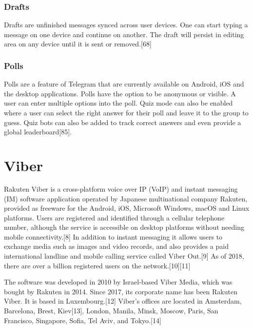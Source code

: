 \documentclass[12pt]{article}
\begin{document}
\subsubsection{Drafts}


Drafts are unfinished messages synced across user devices. One can start typing a message on one device and continue on another. The draft will persist in editing area on any device until it is sent or removed.[68]





\subsubsection{Polls}


Polls are a feature of Telegram that are currently available on Android, iOS and the desktop applications. Polls have the option to be anonymous or visible. A user can enter multiple options into the poll. Quiz mode can also be enabled where a user can select the right answer for their poll and leave it to the group to guess. Quiz bots can also be added to track correct answers and even provide a global leaderboard[85]. 







\section{Viber}



Rakuten Viber is a cross-platform voice over IP (VoIP) and instant messaging (IM) software application operated by Japanese multinational company Rakuten, provided as freeware for the Android, iOS, Microsoft Windows, macOS and Linux platforms. Users are registered and identified through a cellular telephone number, although the service is accessible on desktop platforms without needing mobile connectivity.[8] In addition to instant messaging it allows users to exchange media such as images and video records, and also provides a paid international landline and mobile calling service called Viber Out.[9] As of 2018, there are over a billion registered users on the network.[10][11]

The software was developed in 2010 by Israel-based Viber Media, which was bought by Rakuten in 2014. Since 2017, its corporate name has been Rakuten Viber. It is based in Luxembourg.[12] Viber's offices are located in Amsterdam, Barcelona, Brest, Kiev[13], London, Manila, Minsk, Moscow, Paris, San Francisco, Singapore, Sofia, Tel Aviv, and Tokyo.[14] 
\end{document}
